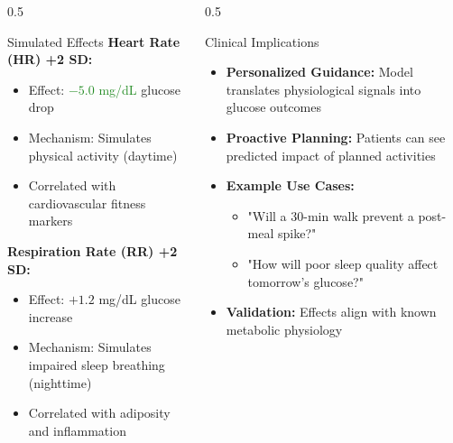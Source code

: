 \documentclass[aspectratio=169,xcolor=dvipsnames]{beamer}
\begin{document}
\begin{frame}
    \begin{columns}
        \begin{column}{0.5\textwidth}
            \begin{block}{Simulated Effects}
                \textbf{Heart Rate (HR) +2 SD:}
                \begin{itemize}
                    \item Effect: \textcolor{ForestGreen}{$-5.0$ mg/dL} glucose drop
                    \item Mechanism: Simulates physical activity (daytime)
                    \item Correlated with cardiovascular fitness markers
                \end{itemize}
                
                \vspace{0.5em}
                \textbf{Respiration Rate (RR) +2 SD:}
                \begin{itemize}
                    \item Effect: \textcolor{BrickRed}{$+1.2$ mg/dL} glucose increase
                    \item Mechanism: Simulates impaired sleep breathing (nighttime)
                    \item Correlated with adiposity and inflammation
                \end{itemize}
            \end{block}
        \end{column}
        
        \begin{column}{0.5\textwidth}
            \begin{block}{Clinical Implications}
                \begin{itemize}
                    \item \textbf{Personalized Guidance:} Model translates physiological signals into glucose outcomes
                    \item \textbf{Proactive Planning:} Patients can see predicted impact of planned activities
                    \item \textbf{Example Use Cases:}
                    \begin{itemize}
                        \item "Will a 30-min walk prevent a post-meal spike?"
                        \item "How will poor sleep quality affect tomorrow's glucose?"
                    \end{itemize}
                    \item \textbf{Validation:} Effects align with known metabolic physiology
                \end{itemize}
            \end{block}
        \end{column}
    \end{columns}
    
\end{frame}
\end{document}
